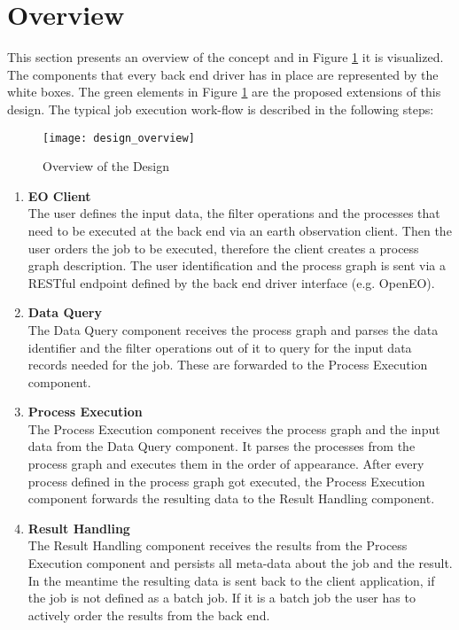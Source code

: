 \documentclass[draft,final]{vutinfth} %
\begin{document}
\section{Overview}\label{Design:Overview}
This section presents an overview of the concept and in Figure \ref{fig:overview} it is visualized. The components that every back end driver has in place are represented by the white boxes. The green elements in Figure \ref{fig:overview} are the proposed extensions of this design. The typical job execution work-flow is described in the following steps:

\begin{figure}[h]
	\centering
	\texttt{[image: design\_overview]}
	\caption{Overview of the Design}
	\label{fig:overview} 
\end{figure}

 \begin{enumerate}
	\item \textbf{EO Client} \\
	The user defines the input data, the filter operations and the processes that need to be executed at the back end via an earth observation client. Then the user orders the job to be executed, therefore the client creates a process graph description. The user identification and the process graph is sent via a RESTful endpoint defined by the back end driver interface (e.g. OpenEO).  
	\item \textbf{Data Query} \\ 
	The Data Query component receives the process graph and parses the data identifier and the filter operations out of it to query for the input data records needed for the job. These are forwarded to the Process Execution component.  
	\item \textbf{Process Execution} \\
	The Process Execution component receives the process graph and the input data from the Data Query component. It parses the processes from the process graph and executes them in the order of appearance. After every process defined in the process graph got executed, the Process Execution component forwards the resulting data to the Result Handling component.   
	\item \textbf{Result Handling} \\ 
	The Result Handling component receives the results from the Process Execution component and persists all meta-data about the job and the result. In the meantime the resulting data is sent back to the client application, if the job is not defined as a batch job. If it is a batch job the user has to actively order the results from the back end.  
\end{enumerate}
\end{document}
